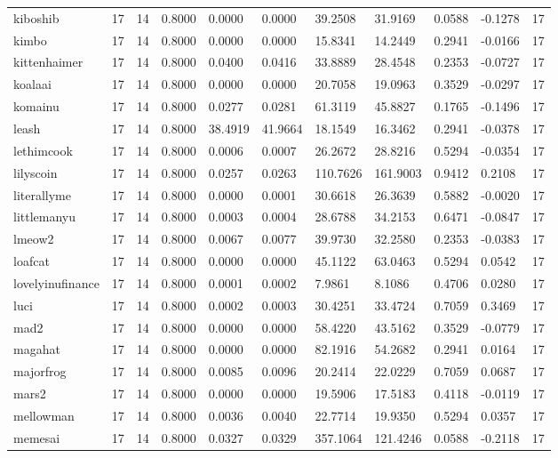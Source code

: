 \begin{table}[htbp]
\begin{tabular}{lllllllllll}
kiboshib & 17 & 14 & 0.8000 & 0.0000 & 0.0000 & 39.2508 & 31.9169 & 0.0588 & -0.1278 & 17 \\
kimbo & 17 & 14 & 0.8000 & 0.0000 & 0.0000 & 15.8341 & 14.2449 & 0.2941 & -0.0166 & 17 \\
kittenhaimer & 17 & 14 & 0.8000 & 0.0400 & 0.0416 & 33.8889 & 28.4548 & 0.2353 & -0.0727 & 17 \\
koalaai & 17 & 14 & 0.8000 & 0.0000 & 0.0000 & 20.7058 & 19.0963 & 0.3529 & -0.0297 & 17 \\
komainu & 17 & 14 & 0.8000 & 0.0277 & 0.0281 & 61.3119 & 45.8827 & 0.1765 & -0.1496 & 17 \\
leash & 17 & 14 & 0.8000 & 38.4919 & 41.9664 & 18.1549 & 16.3462 & 0.2941 & -0.0378 & 17 \\
lethimcook & 17 & 14 & 0.8000 & 0.0006 & 0.0007 & 26.2672 & 28.8216 & 0.5294 & -0.0354 & 17 \\
lilyscoin & 17 & 14 & 0.8000 & 0.0257 & 0.0263 & 110.7626 & 161.9003 & 0.9412 & 0.2108 & 17 \\
literallyme & 17 & 14 & 0.8000 & 0.0000 & 0.0001 & 30.6618 & 26.3639 & 0.5882 & -0.0020 & 17 \\
littlemanyu & 17 & 14 & 0.8000 & 0.0003 & 0.0004 & 28.6788 & 34.2153 & 0.6471 & -0.0847 & 17 \\
lmeow2 & 17 & 14 & 0.8000 & 0.0067 & 0.0077 & 39.9730 & 32.2580 & 0.2353 & -0.0383 & 17 \\
loafcat & 17 & 14 & 0.8000 & 0.0000 & 0.0000 & 45.1122 & 63.0463 & 0.5294 & 0.0542 & 17 \\
lovelyinufinance & 17 & 14 & 0.8000 & 0.0001 & 0.0002 & 7.9861 & 8.1086 & 0.4706 & 0.0280 & 17 \\
luci & 17 & 14 & 0.8000 & 0.0002 & 0.0003 & 30.4251 & 33.4724 & 0.7059 & 0.3469 & 17 \\
mad2 & 17 & 14 & 0.8000 & 0.0000 & 0.0000 & 58.4220 & 43.5162 & 0.3529 & -0.0779 & 17 \\
magahat & 17 & 14 & 0.8000 & 0.0000 & 0.0000 & 82.1916 & 54.2682 & 0.2941 & 0.0164 & 17 \\
majorfrog & 17 & 14 & 0.8000 & 0.0085 & 0.0096 & 20.2414 & 22.0229 & 0.7059 & 0.0687 & 17 \\
mars2 & 17 & 14 & 0.8000 & 0.0000 & 0.0000 & 19.5906 & 17.5183 & 0.4118 & -0.0119 & 17 \\
mellowman & 17 & 14 & 0.8000 & 0.0036 & 0.0040 & 22.7714 & 19.9350 & 0.5294 & 0.0357 & 17 \\
memesai & 17 & 14 & 0.8000 & 0.0327 & 0.0329 & 357.1064 & 121.4246 & 0.0588 & -0.2118 & 17 \\

\end{tabular}
\end{table}
